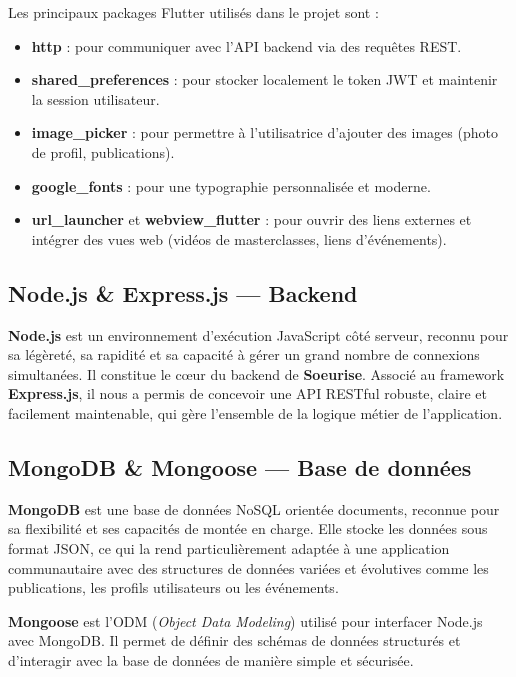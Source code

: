 \documentclass[12pt,a4paper]{report}
\begin{document}
	Les principaux packages Flutter utilisés dans le projet sont :
	\begin{itemize}
		\item \textbf{http} : pour communiquer avec l'API backend via des requêtes REST.
		\item \textbf{shared\_preferences} : pour stocker localement le token JWT 
		et maintenir la session utilisateur.
		\item \textbf{image\_picker} : pour permettre à l'utilisatrice d'ajouter 
		des images (photo de profil, publications).
		\item \textbf{google\_fonts} : pour une typographie personnalisée et moderne.
		\item \textbf{url\_launcher} et \textbf{webview\_flutter} : pour ouvrir 
		des liens externes et intégrer des vues web (vidéos de masterclasses, 
		liens d'événements).
	\end{itemize}
	
	\subsection{Node.js \& Express.js — Backend}
	
	\textbf{Node.js} est un environnement d'exécution JavaScript côté serveur, 
	reconnu pour sa légèreté, sa rapidité et sa capacité à gérer un grand nombre 
	de connexions simultanées. Il constitue le cœur du backend de \textbf{Soeurise}. 
	Associé au framework \textbf{Express.js}, il nous a permis de concevoir une 
	API RESTful robuste, claire et facilement maintenable, qui gère l'ensemble de 
	la logique métier de l'application.
	
	\subsection{MongoDB \& Mongoose — Base de données}
	
	\textbf{MongoDB} est une base de données NoSQL orientée documents, reconnue 
	pour sa flexibilité et ses capacités de montée en charge. Elle stocke les données 
	sous format JSON, ce qui la rend particulièrement adaptée à une application 
	communautaire avec des structures de données variées et évolutives comme 
	les publications, les profils utilisateurs ou les événements.
	
	\textbf{Mongoose} est l'ODM (\textit{Object Data Modeling}) utilisé pour 
	interfacer Node.js avec MongoDB. Il permet de définir des schémas de données 
	structurés et d'interagir avec la base de données de manière simple et sécurisée.
	
\end{document}
